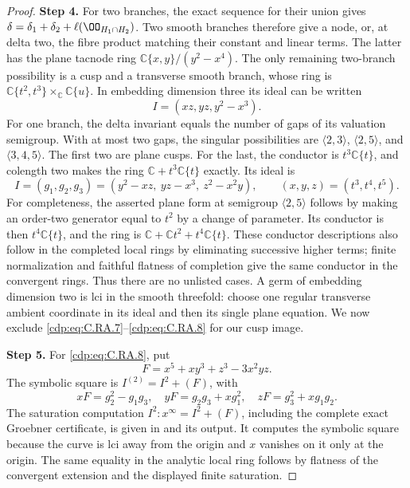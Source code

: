 \begin{proof}
\noindent\textbf{Step 4.} For two branches, the exact sequence for their union gives
$\delta=\delta_1+\delta_2+\ell(\OO_{H_1\cap H_2})$.
Two smooth branches therefore give a node, or, at delta
two, the fibre product matching their constant and linear
terms. The latter has the plane tacnode ring
$\mathbb C\{x,y\}/(y^2-x^4)$.
The only remaining two-branch possibility is a cusp and
a transverse smooth branch, whose ring is
$\mathbb C\{t^2,t^3\}\times_{\mathbb C}\mathbb C\{u\}$.
In embedding dimension three its ideal can be written
\[
                  I=(xz,yz,y^2-x^3).            \tag{C.RA.7}\label{cdp:eq:C.RA.7}
\]
For one branch, the delta invariant equals the number of
gaps of its valuation semigroup. With at most two gaps,
the singular possibilities are
$\langle2,3\rangle$, $\langle2,5\rangle$, and
$\langle3,4,5\rangle$. The first two are plane cusps.
For the last, the conductor is $t^3\mathbb C\{t\}$,
and colength two makes the ring
$\mathbb C+t^3\mathbb C\{t\}$ exactly. Its ideal is
\[
 I=(g_1,g_2,g_3)
   =(y^2-xz,\ yz-x^3,\ z^2-x^2y),\qquad
 (x,y,z)=(t^3,t^4,t^5).                         \tag{C.RA.8}\label{cdp:eq:C.RA.8}
\]
For completeness, the asserted plane form at semigroup
$\langle2,5\rangle$ follows by making an order-two
generator equal to $t^2$ by a change of parameter.
Its conductor is then $t^4\mathbb C\{t\}$, and the ring
is $\mathbb C+\mathbb Ct^2+t^4\mathbb C\{t\}$.
These conductor descriptions also follow in the completed
local rings by eliminating successive higher terms; finite
normalization and faithful flatness of completion give the
same conductor in the convergent rings. Thus there are no
unlisted cases. A germ of embedding dimension two is lci
in the smooth threefold: choose one regular transverse
ambient coordinate in its ideal and then its single plane
equation. We now exclude \eqref{cdp:eq:C.RA.7}--\eqref{cdp:eq:C.RA.8} for our cusp
image.

\noindent\textbf{Step 5.} For \eqref{cdp:eq:C.RA.8}, put
\[
 F=x^5+xy^3+z^3-3x^2yz .
\]
The symbolic square is $I^{(2)}=I^2+(F)$, with
\[
 xF=g_2^2-g_1g_3,\quad
 yF=g_2g_3+xg_1^2,\quad
 zF=g_3^2+xg_1g_2.                              \tag{C.RA.9}\label{cdp:eq:C.RA.9}
\]
The saturation computation $I^2:x^\infty=I^2+(F)$,
including the complete exact Groebner certificate, is
given in  and its output.
It computes the symbolic square because the curve is lci
away from the origin and $x$ vanishes on it only at the
origin. The same equality in the analytic local ring
follows by flatness of the convergent extension and the
displayed finite saturation.


\end{proof}
